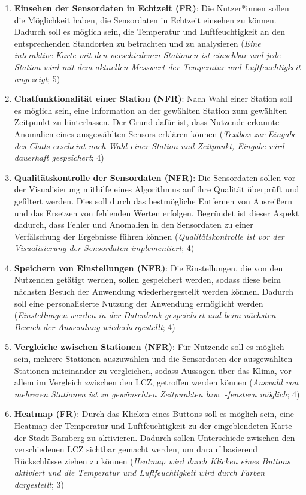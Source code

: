 \begin{enumerate}
    \item \textbf{Einsehen der Sensordaten in Echtzeit (FR)}: Die Nutzer*innen sollen die Möglichkeit haben, die Sensordaten in Echtzeit einsehen zu können. Dadurch soll es möglich sein, die Temperatur und Luftfeuchtigkeit an den entsprechenden Standorten zu betrachten und zu analysieren (\textit{Eine interaktive Karte mit den verschiedenen Stationen ist einsehbar und jede Station wird mit dem aktuellen Messwert der Temperatur und Luftfeuchtigkeit angezeigt}; 5)
    \item \textbf{Chatfunktionalität einer Station (NFR)}: Nach Wahl einer Station soll es möglich sein, eine Information an der gewählten Station zum gewählten Zeitpunkt zu hinterlassen. Der Grund dafür ist, dass Nutzende erkannte Anomalien eines ausgewählten Sensors erklären können (\textit{Textbox zur Eingabe des Chats erscheint nach Wahl einer Station und Zeitpunkt, Eingabe wird dauerhaft gespeichert}; 4)
    \item \textbf{Qualitätskontrolle der Sensordaten (NFR)}: Die Sensordaten sollen vor der Visualisierung mithilfe eines Algorithmus auf ihre Qualität überprüft und gefiltert werden. Dies soll durch das bestmögliche Entfernen von Ausreißern und das Ersetzen von fehlenden Werten erfolgen. Begründet ist dieser Aspekt dadurch, dass Fehler und Anomalien in den Sensordaten zu einer Verfälschung der Ergebnisse führen können (\textit{Qualitätskontrolle ist vor der Visualisierung der Sensordaten implementiert}; 4)
    \item \textbf{Speichern von Einstellungen (NFR)}: Die Einstellungen, die von den Nutzenden getätigt werden, sollen gespeichert werden, sodass diese beim nächsten Besuch der Anwendung wiederhergestellt werden können. Dadurch soll eine personalisierte Nutzung der Anwendung ermöglicht werden (\textit{Einstellungen werden in der Datenbank gespeichert und beim nächsten Besuch der Anwendung wiederhergestellt}; 4)
    \item \textbf{Vergleiche zwischen Stationen (NFR)}: Für Nutzende soll es möglich sein, mehrere Stationen auszuwählen und die Sensordaten der ausgewählten Stationen miteinander zu vergleichen, sodass Aussagen über das Klima, vor allem im Vergleich zwischen den \ac{LCZ}, getroffen werden können (\textit{Auswahl von mehreren Stationen ist zu gewünschten Zeitpunkten bzw. -fenstern möglich}; 4)
    \item \textbf{Heatmap (FR)}: Durch das Klicken eines Buttons soll es möglich sein, eine Heatmap der Temperatur und Luftfeuchtigkeit zu der eingeblendeten Karte der Stadt Bamberg zu aktivieren. Dadurch sollen Unterschiede zwischen den verschiedenen \ac{LCZ} sichtbar gemacht werden, um darauf basierend Rückschlüsse ziehen zu können (\textit{Heatmap wird durch Klicken eines Buttons aktiviert und die Temperatur und Luftfeuchtigkeit wird durch Farben dargestellt}; 3)

\end{enumerate}

